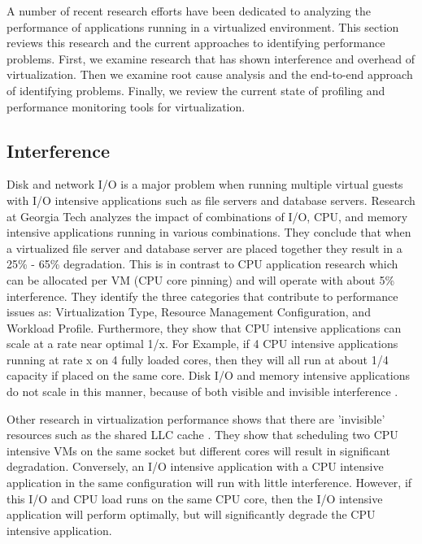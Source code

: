 A number of recent research efforts have been dedicated to analyzing the performance of applications running in a virtualized environment.  This section reviews this research and the current approaches to identifying performance problems.  First, we examine research that has shown interference and overhead of virtualization.   Then we examine root cause analysis and the end-to-end approach of identifying problems.  Finally, we review the current state of profiling and performance monitoring tools for virtualization.

\subsection{Interference}
Disk and network I/O is a major problem when running multiple virtual guests with I/O intensive applications such as file servers and database servers.  Research at Georgia Tech \cite{paul} analyzes the impact of combinations of I/O, CPU, and memory intensive applications running in various combinations.  They conclude that when a virtualized file server and database server are placed together they result in a 25\% - 65\% degradation.  This is in contrast to CPU application research \cite{huber1, huber2} which can be allocated per VM (CPU core pinning) and will operate with about 5\% interference.  They identify the three categories that contribute to performance issues as:  Virtualization Type, Resource Management Configuration, and Workload Profile.  Furthermore, they show that CPU intensive applications can scale at a rate near optimal 1/x.   For Example, if 4 CPU intensive applications running at rate x on 4 fully loaded cores, then they will all run at about 1/4 capacity if placed on the same core.   Disk I/O and memory intensive applications do not scale in this manner, because of both visible and invisible interference \cite{tickoo}.

Other research in virtualization performance shows that there are 'invisible' resources such as the shared LLC cache \cite{tickoo}.  They show that scheduling two CPU intensive VMs on the same socket but different cores will result in significant degradation.  Conversely, an I/O intensive application with a CPU intensive application in the same configuration will run with little interference.  However, if this I/O and CPU load runs on the same CPU core, then the I/O intensive application will perform optimally, but will significantly degrade the CPU intensive application.  

